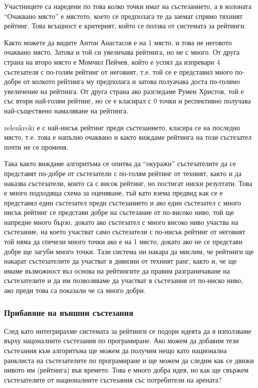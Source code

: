 \documentclass[a4paper,12pt]{article}
\begin{document}
  Участниците са наредени по това колко точки имат на състезанието, а в колоната ``Очаквано място'' е мястото, което се предполага те да заемат спрямо тяхният рейтинг. Това всъщност е критерият, който се ползва от системата за рейтинги.
  
  Както можете да видите Антон Анастасов е на 1 място, и това не неговото очаквано място. Затова и той си увеличава рейтинга, но не с много. От друга страна на второ място е Момчил Пейчев, който е успял да изпревари 4 състезателя с по-голям рейтинг от неговият, т.е. той се е представил много по-добре от колкото рейтинга му предполага и затова полуачава доста по-голямо увеличение на рейтинга. От друга страна ако разгледаме Румен Христов, той е със втори най-голям рейтинг, но се е класирал с 0 точки и респективно получава най-съществено намаляване на рейтинга.
  
  zelenkroki е с най-нисък рейтинг преди състезанието, класира се на последно място, т.е. това е напълно очаквано и както виждаме рейтинга на този състезател почти не се променя.
  
  Така както виждаме алгоритъма се опитва да ``окуражи'' състезателите да се представят по-добре от състезатели с по-голям рейтинг от техният, както и да наказва състезатели, които са с висок рейтинг, но постигат ниски резултати. Това е много подходяща схема за оценяване, тъй като взема предвид как се е представял един състезател преди състезанието и ако един състезател с много нисък рейтинг се представи добре на състезание от по-високо ниво, той ще напредне много бързо, докато ако състезател с много високо ниво участва на състезание, на което участват само състезатели с по-нисък рейтинг от неговият той няма да спечели много точки ако е на 1 място, докато ако не се представи добре ще загуби много точки. Тази система ни накара да мислим, че рейтинги ще накарат състезателите да участват в дивизии от техният ранг, както и, че ще имаме възможност въз основа на рейтингите да правим разграничаване на състезателите и да им позволяваме да участват в състезания от по-ниско ниво, ако преди това са показали че са много добри.
  
  \subsubsection{Прибавяне на външни състезания}
    След като интегрирахме системата за рейтинги се подори идеята да я използваме върху нацоналните състезания по програмиране. Ако можем да добавим тези състезания към алгоритъма ще можем да получим нещо като национална ранклиста на състезателите по програмиране и ще можем да следим как се движи нивото им (рейтинга) във времето. Това е много добра идея, но как ще свържем състезателите от националните състезания със потребители на арената?
    
\end{document}
